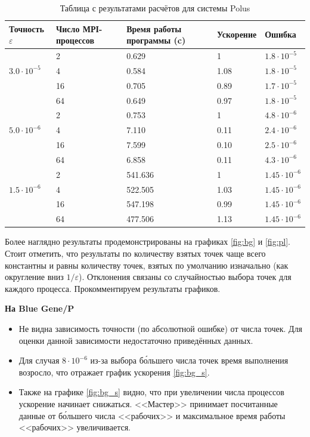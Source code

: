 \documentclass[12pt, fleqn]{article}
\theoremstyle{definition}
\begin{document}
\begin{table}[ht!]
\begin{tabularx}{\linewidth}{|L|L|L|L|L|}
\hline Точность $\varepsilon$ & Число МРІ-процессов & Время работы программы (c) & Ускорение & Ошибка \\
\hline {} & 2 & 0.629 & 1& $1.8 \cdot 10^{-5}$\\
 & 4 & 0.584 & 1.08& $1.8 \cdot 10^{-5}$\\
 & 16 & 0.705& 0.89& $1.7 \cdot 10^{-5}$\\
 & 64 & 0.649& 0.97& $1.8 \cdot 10^{-5}$\\
\hline {} & 2 & 0.753 & 1&$4.8 \cdot 10^{-6}$\\
 & 4 & 7.110 & 0.11&$2.4 \cdot 10^{-6}$ \\
 & 16 & 7.599& 0.10&$2.5 \cdot 10^{-6}$ \\
 & 64 & 6.858& 0.11& $4.3 \cdot 10^{-6}$\\
\hline {} & 2 &541.636 & 1 & $1.45 \cdot 10^{-6}$\\
 & 4 & 522.505& 1.03& $1.45 \cdot 10^{-6}$\\
 & 16 & 547.198& 0.99& $1.45 \cdot 10^{-6}$\\
 & 64 & 477.506& 1.13& $1.45 \cdot 10^{-6}$\\
\hline
\end{tabularx}
\caption{Таблица с результатами расчётов для системы Polus}
\end{table}

Более наглядно результаты продемонстрированы на графиках \ref{fig:bg} и \ref{fig:pl}. Стоит отметить, что результаты по количеству взятых точек чаще всего константны и равны количеству точек, взятых по умолчанию изначально (как округление вниз $1/\varepsilon$). Отклонения связаны со случайностью выбора точек для каждого процесса. 
Прокомментируем результаты графиков. 

\textbf{На Blue Gene/P}
\begin{itemize}
    \setlength{\itemsep}{1pt}
  \setlength{\parskip}{0pt}
  \setlength{\parsep}{0pt}
 \item Не видна зависимость точности (по абсолютной ошибке) от числа точек. Для оценки данной зависимости недостаточно приведённых данных.
 \item Для случая $8 \cdot 10^{-6}$ из-за выбора б\'{о}льшего числа точек время выполнения возросло, что отражает график ускорения \ref{fig:bg_s}.
 \item Также на графике \ref{fig:bg_s} видно, что при увеличении числа процессов ускорение начинает снижаться. <<Мастер>> принимает посчитанные данные от б\'{о}льшего числа <<рабочих>> и максимальное время работы <<рабочих>> увеличивается.
\end{itemize}
\end{document}
